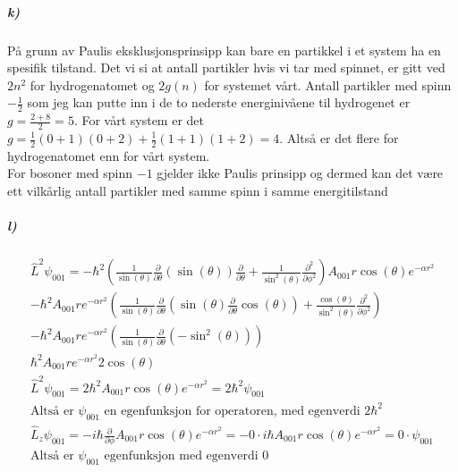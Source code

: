 \documentclass[11pt, A4paper,norsk]{article}
\begin{document}
			\subparagraph{k)}
				\begin{flushleft}
På grunn av Paulis eksklusjonsprinsipp kan bare en partikkel i et system ha en spesifik tilstand. Det vi si at antall partikler hvis vi tar med spinnet, er gitt ved $2n^2$ for hydrogenatomet og $2g(n)$ for systemet vårt. Antall partikler med spinn $- \frac{1}{2}$ som jeg kan putte inn i de to nederste energinivåene til hydrogenet er $g = \frac{2 + 8}{2} = 5$. For vårt system er det $g = \frac{1}{2} (0 + 1)(0 + 2) + \frac{1}{2} (1 + 1)(1 + 2) = 4$. Altså er det flere for hydrogenatomet enn for vårt system. \\
For bosoner med spinn $-1$ gjelder ikke Paulis prinsipp og dermed kan det være ett vilkårlig antall partikler med samme spinn i samme energitilstand
				\end{flushleft}









			\subparagraph{l)}
				\begin{gather*}
\hat{L}^2 \psi_{001} = - \hbar^2 \left( \frac{1}{\sin(\theta)} \frac{\partial}{\partial \theta} \left( \sin(\theta) \right) \frac{\partial}{\partial \theta} + \frac{1}{\sin^2(\theta)} \frac{\partial^2}{\partial \phi^2} \right) A_{001} r \cos(\theta) e^{- \alpha r^2} \\
- \hbar^2 A_{001} r e^{- \alpha r^2} \left( \frac{1}{\sin(\theta)} \frac{\partial}{\partial \theta} \left( \sin(\theta) \frac{\partial}{\partial \theta} \cos(\theta) \right) + \frac{\cos(\theta)}{\sin^2(\theta)} \frac{\partial^2}{\partial \phi^2} \right) \\
- \hbar^2 A_{001} r e^{- \alpha r^2} \left( \frac{1}{\sin(\theta)} \frac{\partial}{\partial \theta} \left( - \sin^2(\theta) \right) \right) \\
\hbar^2 A_{001} r e^{- \alpha r^2} 2 \cos(\theta) \\
\hat{L}^2 \psi_{001} = 2 \hbar^2 A_{001} r \cos(\theta) e^{- \alpha r^2} = 2 \hbar^2 \psi_{001} \\
\text{Altså er $\psi_{001}$ en egenfunksjon for operatoren, med egenverdi $2 \hbar^2$} \\
\hat{L}_z \psi_{001} = - i \hbar \frac{\partial}{\partial \phi} A_{001} r \cos(\theta) e^{- \alpha r^2} = - 0 \cdot i \hbar A_{001} r \cos(\theta) e^{- \alpha r^2} = 0 \cdot \psi_{001} \\
\text{Altså er $\psi_{001}$ egenfunksjon med egenverdi $0$}
				\end{gather*}
\end{document}
